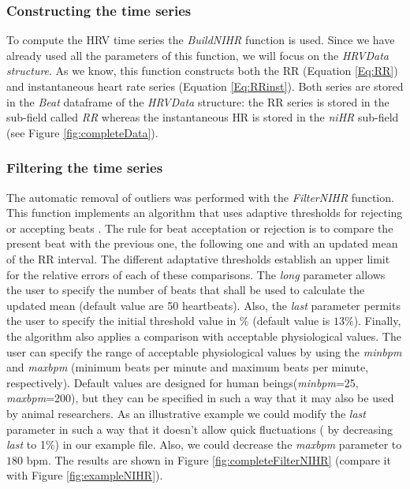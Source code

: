 \documentclass[12pt,lot, lof]{puthesis}
\begin{document}
\subsubsection{Constructing the time series} To compute the HRV time series the 
\textit{BuildNIHR} function is used.
 Since we have already used all the parameters of this function, we will focus 
on the \textit{HRVData structure}. As we know, this function constructs both 
the RR (Equation \ref{Eq:RR}) and instantaneous heart rate series (Equation 
\ref{Eq:RRinst}). Both series are stored in the \textit{Beat} dataframe of the 
\textit{HRVData} structure: the RR series is stored in the sub-field called 
\textit{RR} whereas the instantaneous \gls{HR} is stored in the \textit{niHR} 
sub-field (see Figure \ref{fig:completeData}).\\

\subsubsection{Filtering the time series}
The automatic removal of outliers was performed with the \textit{FilterNIHR} 
function. This function implements
an algorithm that uses adaptive thresholds for rejecting or accepting beats 
\cite{vila1997time}. The rule for beat acceptation or rejection is to compare 
the present beat with  the previous one, the following one and with an updated 
mean of the RR interval. The different adaptative thresholds establish an upper 
limit for the relative errors of each of these comparisons. The \textit{long} 
parameter allows the user to specify the number of beats that shall be used to 
calculate the updated mean (default value are 50 heartbeats). Also, the 
\textit{last} parameter permits the user to specify the initial threshold value 
in \% (default value is $13\%$). Finally, the algorithm also applies a 
comparison with acceptable physiological values. The user can specify the range 
of acceptable physiological values by using the \textit{minbpm} and 
\textit{maxbpm} (minimum beats per minute and maximum beats per minute, 
respectively). Default values are designed for human beings(\textit{minbpm}=25, 
\textit{maxbpm}=200),  but they can be specified in such a way that it may also 
be used by animal researchers. As an illustrative example we could modify the 
\textit{last} parameter in such a way that it doesn't allow quick fluctuations 
( by decreasing \textit{last} to 1\%) in our example file. Also, we could 
decrease the \textit{maxbpm} parameter to $180$ bpm. The results are shown in 
Figure \ref{fig:completeFilterNIHR} (compare it with Figure 
\ref{fig:exampleNIHR}). 
\end{document}
